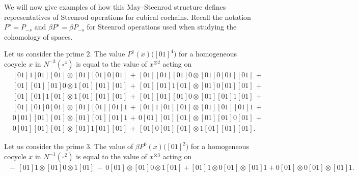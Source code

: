 We will now give examples of how this May--Steenrod structure defines representatives of Steenrod operations for cubical cochains.
Recall the notation $P^s = P_{-s}$ and $\beta P^s = \beta P_{-s}$ for Steenrod operations used when studying the cohomology of spaces.

\begin{example}
	Let us consider the prime $2$.
	The value $P^1(x)\big([01]^{4}\big)$ for a homogeneous cocycle $x$ in $N^{-3}(\square^4)$ is equal to the value of $x^{\otimes 2}$ acting on
	\begin{align*}&
	[01]1[01][01] \otimes [01][01]0[01]\,+\,
	[01][01][01]0 \otimes [01]0[01][01]\,+\, \\&
	[01][01][01]0 \otimes 1[01][01][01]\,+\,
	[01][01]1[01] \otimes [01]0[01][01]\,+\, \\&
	[01][01]1[01] \otimes 1[01][01][01]\,+\,
	[01][01][01]0 \otimes [01][01]1[01]\,+\, \\&
	[01][01]0[01] \otimes [01][01][01]1\,+\,
	[01]1[01][01] \otimes [01][01][01]1\,+\, \\&
	0[01][01][01] \otimes [01][01][01]1\,+\,
	0[01][01][01] \otimes [01][01]0[01]\,+\, \\&
	0[01][01][01] \otimes [01]1[01][01]\,+\,
	[01]0[01][01] \otimes 1[01][01][01].\,\phantom{+}\,
	\end{align*}
\end{example}

\begin{example}
	Let us consider the prime $3$.
	The value of $\beta P^0(x)\big([01]^2\big)$ for a homogeneous cocycle $x$ in $N^{-1}(\square^2)$ is equal to the value of $x^{\otimes 3}$ acting on
	\begin{align*}
	\,-\, [01]1 \otimes [01]0 \otimes 1[01] \,-\, 0[01] \otimes [01]0 \otimes 1[01] + [01]1 \otimes 0[01] \otimes [01]1 + 0[01] \otimes 0[01] \otimes [01]1.
	\end{align*}
\end{example}
